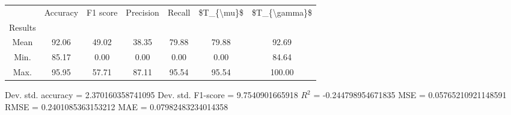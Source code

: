 \begin{tabular}{|c|c|c|c|c|c|c|}
\toprule
{} &  Accuracy &  F1 score &  Precision &  Recall &  \$T\_\{\textbackslash mu\}\$ &  \$T\_\{\textbackslash gamma\}\$ \\
Results &           &           &            &         &            &               \\
\hline
Mean    &     92.06 &     49.02 &      38.35 &   79.88 &      79.88 &         92.69 \\
Min.    &     85.17 &      0.00 &       0.00 &    0.00 &       0.00 &         84.64 \\
Max.    &     95.95 &     57.71 &      87.11 &   95.54 &      95.54 &        100.00 \\
\bottomrule
\end{tabular}

 Dev. std. accuracy = 2.370160358741095
 Dev. std. F1-score = 9.7540901665918
 $R^2$ = -0.244798954671835
 MSE = 0.05765210921148591
 RMSE = 0.2401085363153212
 MAE = 0.07982483234014358